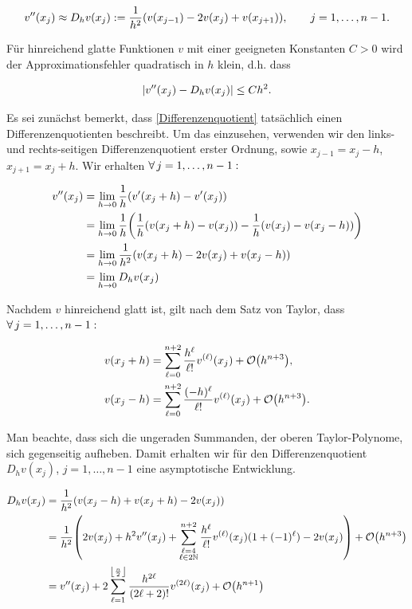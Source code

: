\begin{align} %
  v^\primeprime(x_j) \approx
  D_h v(x_j) :=
  \frac{1}{h^2} (v(x_{j-1}) - 2 v(x_j) + v(x_{j+1})), \qquad
  j = 1, \ldots, n-1.
\end{align}

Für hinreichend glatte Funktionen $v$ mit einer geeigneten Konstanten $C > 0$ wird der Approximationsfehler quadratisch in $h$ klein, d.h. dass

\begin{align} \label{quadratische_Konvergenz}
  {\left | v^{\prime \prime}(x_j) - D_h v(x_j) \right |} \leq C h^2.
\end{align}

Es sei zunächst bemerkt, dass \eqref{Differenzenquotient} tatsächlich einen Differenzenquotienten beschreibt. Um das einzusehen, verwenden wir den links- und rechts-seitigen Differenzenquotient erster Ordnung, sowie $x_{j-1} = x_j - h$, $x_{j+1} = x_j + h$. Wir erhalten $\forall \, j = 1, \ldots, n-1:$

\begin{align*}
  v^{\prime \prime}(x_j)
  & = \lim_{h \to 0}
      \frac{1}{h} {\left ( 
        v^\prime(x_j + h) - v^\prime(x_j)
       \right )} \\
  & = \lim_{h \to 0}
      \frac{1}{h} {\left ( 
        \frac{1}{h} {\left ( 
          v(x_j + h) - v(x_j)
         \right )} -
        \frac{1}{h} {\left ( 
          v(x_j) - v(x_j - h)
         \right )}
       \right )} \\
  & = \lim_{h \to 0}
      \frac{1}{h^2} {\left ( 
        v(x_j + h) - 2 v(x_j) + v(x_j - h)
       \right )} \\
  & = \lim_{h \to 0}
      D_h v(x_j)
\end{align*}

Nachdem $v$ hinreichend glatt ist, gilt nach dem Satz von Taylor, dass $\forall \, j = 1, \ldots, n-1:$

\begin{align*}
  v(x_j + h) & =
  \sum_{\ell = 0}^{n+2}
  \frac{h^\ell}{\ell !}
  v^{(\ell)}(x_j) +
  \mathcal{O} {\left ( h^{n+3} \right )}, \\
  v(x_j - h) & =
  \sum_{\ell = 0}^{n+2}
  \frac{(-h)^\ell}{\ell !}
  v^{(\ell)}(x_j) +
  \mathcal{O} {\left ( h^{n+3} \right )}.
\end{align*}

Man beachte, dass sich die ungeraden Summanden, der oberen Taylor-Polynome, sich gegenseitig aufheben. Damit erhalten wir für den Differenzenquotient $D_h v(x_j)$, $j = 1, \ldots, n-1$ eine asymptotische Entwicklung.

\begin{align*}
  D_h v(x_j)
  & = \frac{1}{h^2} {\left ( 
    v(x_j - h) + v(x_j + h) - 2 v(x_j)
   \right )} \\
  & = \frac{1}{h^2} {\left ( 
        2 v(x_j) +
        h^2 v^{\prime \prime}(x_j) +
        \sum_{\substack{\ell = 4 \\ \ell \in 2 \mathbb{N}}}^{n+2}
        \frac{h^\ell}{\ell !}
        v^{(\ell)}(x_j)
        (1 + (-1)^\ell) -
        2 v(x_j)
       \right )} +
      \mathcal{O} {\left ( h^{n+3} \right )} \\
  & = v^{\prime \prime}(x_j) +
      2 \sum_{\ell = 1}^{\left \lfloor \frac{n}{2} \right \rfloor}
      \frac{h^{2 \ell}}{(2 \ell + 2)!}
      v^{(2 \ell)}(x_j) +
      \mathcal{O} {\left ( h^{n+1} \right )}
\end{align*}

